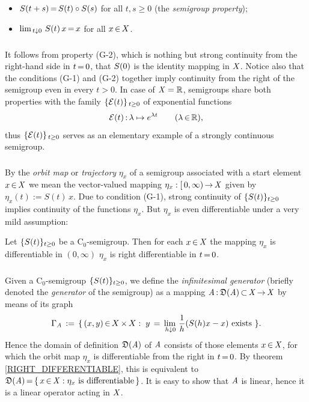 \documentclass[11pt,twoside]{article}
\begin{document}
\begin{itemize}[leftmargin=30pt]
\item[(G-1)]
$\linS(t+s) \eq \linS(t) \circ \linS(s)$ for all $t,s \geq 0$
(the \textit{semigroup property});

\item[(G-2)]
$\lim_{\,t \downarrow 0} \, \linS(t)\,x \eq x$ for all $x \xeof X$.
\end{itemize}

\subparagraph*{}
It follows from property (G-2),
which is nothing but strong continuity from the right-hand side in $t \eq 0$,
that $\linS(0)$ is the identity mapping in $\banX$.
Notice also
that the conditions (G-1) and (G-2) together
imply continuity from the right of the semigroup even in every $t > 0$.
In case of $\banX=\R$,
semigroups share both properties
with the family $\{\cal{E}(t)\}_{\, t \geq 0}$ of exponential functions
\[
\cal{E}(t) \: \lambda \mapsto e^{\lambda t} \quad \quad (\lambda \xeof \R),
\]
thus $\{\cal{E}(t)\}_{\, t \geq 0}$ serves as an elementary example
of a strongly continuous semigroup.

\subsubsection*{} %
By the \textit{orbit map} or \textit{trajectory} $\eta_x$ of a semigroup
associated with a start element $x \xeof \banX$
we mean the vector-valued mapping $\eta_x:[\,0,\infty) \xto \banX$
given by $\eta_x(t) := S(t) \, x$.
Due to condition (G-1),
strong continuity of $\{\linS(t)\}_{t \geq 0}$
implies continuity of the functions $\eta_x$.
But $\eta_x$ is even differentiable under a very mild assumption:

\begin{theorem}\label{RIGHT_DIFFERENTIABLE}
Let $\{\linS(t)\}_{t \geq 0}$ be a C$_0$-semigroup.
Then for each $x \xeof \banX$
the mapping $\eta_x$ is differentiable in $(0,\infty)$
\iff
$\eta_x$ is right differentiable in $t \eq 0$.
\end{theorem}

\subsubsection*{} %
Given a C$_0$-semigroup $\{\linS(t)\}_{t \geq 0}$,
we define the \textit{infinitesimal generator}
(briefly denoted the \textit{generator} of the semigroup)
as a mapping $\linA \: \domain{\linA} \xsubset \banX \xto \banX$
by means of its graph
\[
\Gamma_{\linA}
\eqdef
\{\,(x,y) \xeof X \xtimes X: \;
y \= \lim_{\,h \downarrow 0} \, \frac{1}{h}(\linS(h)x-x) \exists \}.
\]
Hence the domain of definition $\domain{\linA}$ of $\linA$
consists of those elements $x \xeof \banX$,
for which the orbit map $\eta_x$ is differentiable from the right in $t \eq 0$.
By theorem \ref{RIGHT_DIFFERENTIABLE},
this is equivalent to
$\domain{\linA} \eq \{\,x \xeof \banX: \eta_x \mbox{ is differentiable}\,\}$.
It is easy to show that
$\linA$ is linear,
hence it is a linear operator acting in $\banX$.
\end{document}
